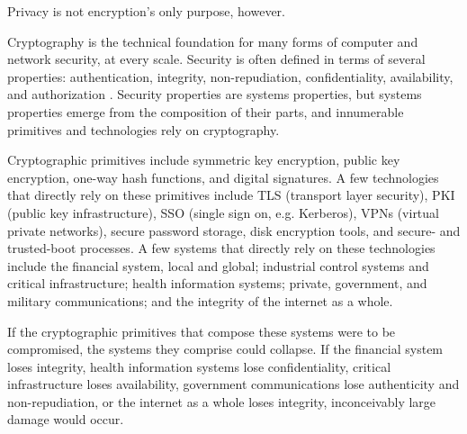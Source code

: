 
Privacy is not encryption's only purpose, however.


Cryptography is the technical foundation for many forms of computer and network security, at every scale. Security is
often defined in terms of several properties: authentication, integrity, non-repudiation, confidentiality, availability,
and authorization \cite{shostack_threat_2014}. Security properties are systems properties, but systems properties emerge
from the composition of their parts, and innumerable primitives and technologies rely on cryptography.

Cryptographic primitives include symmetric key encryption, public key encryption, one-way hash functions, and digital
signatures. A few technologies that directly rely on these primitives include TLS (transport layer security), PKI
(public key infrastructure), SSO (single sign on, e.g. Kerberos), VPNs (virtual private networks), secure password
storage, disk encryption tools, and secure- and trusted-boot processes. A few systems that directly rely on these
technologies include the financial system, local and global; industrial control systems and critical infrastructure;
health information systems; private, government, and military communications; and the integrity of the internet as a
whole.

If the cryptographic primitives that compose these systems were to be compromised, the systems they comprise could
collapse. If the financial system loses integrity, health information systems lose confidentiality, critical
infrastructure loses availability, government communications lose authenticity and non-repudiation, or the internet as a
whole loses integrity, inconceivably large damage would occur.


